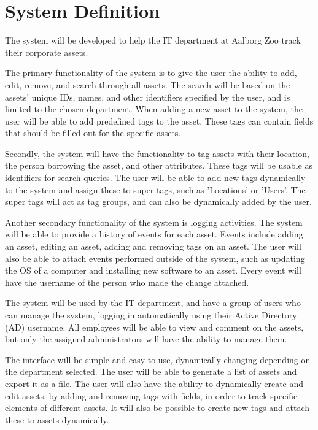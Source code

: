 \section{System Definition}
The system will be developed to help the IT department at Aalborg Zoo track their corporate assets.
\par
The primary functionality of the system is to give the user the ability to add, edit, remove, and search through all assets. The search will be based on the assets' unique IDs, names, and other identifiers specified by the user, and is limited to the chosen department. When adding a new asset to the system, the user will be able to add predefined tags to the asset. These tags can contain fields that should be filled out for the specific assets.
\par
Secondly, the system will have the functionality to tag assets with their location, the person borrowing the asset, and other attributes. These tags will be usable as identifiers for search queries. The user will be able to add new tags dynamically to the system and assign these to super tags, such as 'Locations' or 'Users'. The super tags will act as tag groups, and can also be dynamically added by the user. 
\par
Another secondary functionality of the system is logging activities. The system will be able to provide a history of events for each asset. Events include adding an asset, editing an asset, adding and removing tags on an asset. The user will also be able to attach events performed outside of the system, such as updating the OS of a computer and installing new software to an asset. Every event will have the username of the person who made the change attached.
\par
The system will be used by the IT department, and have a group of users who can manage the system, logging in automatically using their Active Directory (AD) username. All employees will be able to view and comment on the assets, but only the assigned administrators will have the ability to manage them. 
\par
The interface will be simple and easy to use, dynamically changing depending on the department selected. The user will be able to generate a list of assets and export it as a file. The user will also have the ability to dynamically create and edit assets, by adding and removing tags with fields, in order to track specific elements of different assets. It will also be possible to create new tags and attach these to assets dynamically.
